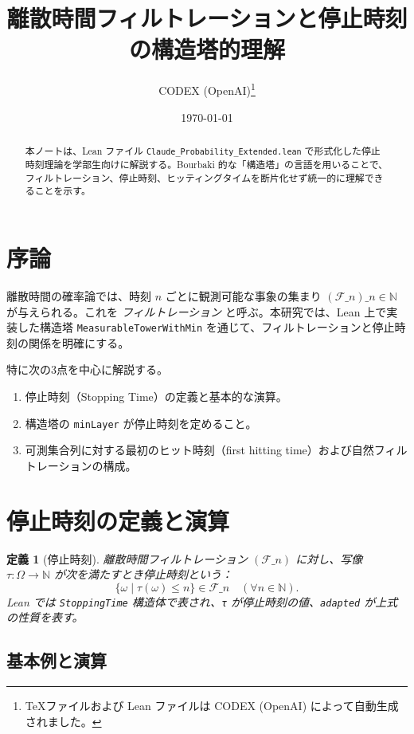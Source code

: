 \documentclass[a4paper]{ltjsarticle}
\title{離散時間フィルトレーションと停止時刻の構造塔的理解}
\author{CODEX (OpenAI)\thanks{TeXファイルおよび Lean ファイルは CODEX (OpenAI) によって自動生成されました。}}
\date{\today}
\newtheorem{definition}{定義}
\theoremstyle{remark}
\begin{document}
\maketitle

\begin{abstract}
本ノートは、Lean ファイル \texttt{Claude\_Probability\_Extended.lean} で形式化した停止時刻理論を学部生向けに解説する。Bourbaki 的な「構造塔」の言語を用いることで、フィルトレーション、停止時刻、ヒッティングタイムを断片化せず統一的に理解できることを示す。
\end{abstract}

\tableofcontents

\section{序論}

離散時間の確率論では、時刻 $n$ ごとに観測可能な事象の集まり $(\mathcal{F}\_n)\_{n\in\mathbb{N}}$ が与えられる。これを \emph{フィルトレーション} と呼ぶ。本研究では、Lean 上で実装した構造塔 \texttt{MeasurableTowerWithMin} を通じて、フィルトレーションと停止時刻の関係を明確にする。

特に次の3点を中心に解説する。
\begin{enumerate}[label=(\arabic*), nosep]
  \item 停止時刻（Stopping Time）の定義と基本的な演算。
  \item 構造塔の \texttt{minLayer} が停止時刻を定めること。
  \item 可測集合列に対する最初のヒット時刻（first hitting time）および自然フィルトレーションの構成。
\end{enumerate}

\section{停止時刻の定義と演算}

\begin{definition}[停止時刻]
離散時間フィルトレーション $(\mathcal{F}\_n)$ に対し、写像 $\tau:\Omega\to\mathbb{N}$ が次を満たすとき停止時刻という：
\[
 \{\omega \mid \tau(\omega)\le n\} \in \mathcal{F}\_n \quad (\forall n\in\mathbb{N}).
\]
Lean では \texttt{StoppingTime} 構造体で表され、\texttt{τ} が停止時刻の値、\texttt{adapted} が上式の性質を表す。
\end{definition}

\subsection{基本例と演算}
\end{document}

